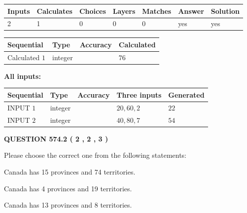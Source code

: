 \documentclass[12pt]{article}
\begin{document}
   
\noindent\begin{tabular}{|l|l|l|l|l|l|l|}
 \hline
Inputs & Calculates & Choices & Layers & Matches & Answer & Solution \\ \hline
 2  & 
 1  & 
 0
  & 
 0  & 
 0  & 
  yes & 
  yes 
  \\ \hline
 \end{tabular}
   
   
   
   
\noindent{}
   
   
  
  
\noindent\begin{tabular}{|l|l|l|l|}
\hline
 Sequential & Type & Accuracy & Calculated \\ 
\hline
 
 
  Calculated $  1 $ & integer &  & 
  $ 76 $ 
 \\  \hline  
 \end{tabular}
   
   
   
   
\noindent\vspace{0.1in}\hspace{-0.08in} {\textbf{\Large{All inputs: }}}
   
   
  
  
\noindent\begin{tabular}{|l|l|l|l|l|}
\hline
 Sequential & Type & Accuracy & Three inputs & Generated \\ 
\hline
 
 
  INPUT $  1 $ & integer &  & $
 20
 , 
 60
 , 
 2
 $ & $ 22 $ 
 \\  \hline  
 
 
  INPUT $  2 $ & integer &  & $
 40
 , 
 80
 , 
 7
 $ & $ 54 $ 
 \\  \hline  
 \end{tabular}
   
   
  
\vspace{0.2in}
  
{\textbf{\Large{QUESTION
574.2 
 ( 2 , 2 , 3 )
}}}
  
  
Please choose the correct one from the following statements:
 
 
Canada has  15 provinces and  74 territories.
 
 
Canada has   4 provinces and  19 territories.
 
 
Canada has  13 provinces and  8 territories.
 
\end{document}
